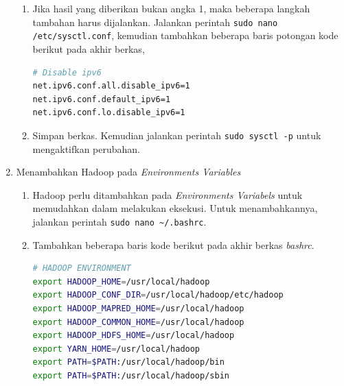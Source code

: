 \begin{enumerate}
\begin{enumerate}
    \item Jika hasil yang diberikan bukan angka 1, maka beberapa langkah tambahan harus dijalankan. Jalankan perintah \verb|sudo nano /etc/sysctl.conf|, kemudian tambahkan beberapa baris potongan kode berikut pada akhir berkas,
      \begin{lstlisting}[language=bash]
# Disable ipv6
net.ipv6.conf.all.disable_ipv6=1
net.ipv6.conf.default_ipv6=1
net.ipv6.conf.lo.disable_ipv6=1
      \end{lstlisting}
    \item Simpan berkas. Kemudian jalankan perintah \verb|sudo sysctl -p| untuk mengaktifkan perubahan.
  \end{enumerate}
  \item Menambahkan Hadoop pada \textit{Environments Variables}
  \begin{enumerate}
    \item Hadoop perlu ditambahkan pada \textit{Environments Variabels} untuk memudahkan dalam melakukan eksekusi. Untuk menambahkannya, jalankan perintah \verb|sudo nano ~/.bashrc|.
    \item Tambahkan beberapa baris kode berikut pada akhir berkas \textit{bashrc}.
      \begin{lstlisting}[language=bash]
# HADOOP ENVIRONMENT
export HADOOP_HOME=/usr/local/hadoop
export HADOOP_CONF_DIR=/usr/local/hadoop/etc/hadoop
export HADOOP_MAPRED_HOME=/usr/local/hadoop
export HADOOP_COMMON_HOME=/usr/local/hadoop
export HADOOP_HDFS_HOME=/usr/local/hadoop
export YARN_HOME=/usr/local/hadoop
export PATH=$PATH:/usr/local/hadoop/bin
export PATH=$PATH:/usr/local/hadoop/sbin


\end{lstlisting}
\end{enumerate}
\end{enumerate}
